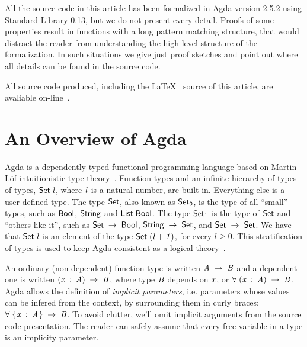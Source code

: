 \documentclass[sigconf]{acmart}
\renewcommand{\geq}{\geqslant}
\theoremstyle{definition}
\newcommand{\D}[1]{\blue{\mathsf{#1}}}
\newcommand{\V}[1]{\purple{\mathit{#1}}}
\begin{document}
All the source code in this article has been formalized in Agda
version 2.5.2 using Standard Library 0.13, but
we do not present every detail. Proofs of some properties result in
functions with a long pattern matching structure, that would distract
the reader from understanding the high-level structure of the
formalization. In such situations we give just proof sketches and point
out where all details can be found in the source code.

All source code produced, including
the \LaTeX~ source of this article, are avaliable
on-line~\cite{regex-rep}.


\section{An Overview of Agda}\label{sec:agda}

Agda is a dependently-typed functional programming language based on
Martin-L\"of intuitionistic type theory~\cite{Lof98}.  Function types
and an infinite hierarchy of types of types, \ensuremath{\D{Set}\;\V{l}}, where \ensuremath{\V{l}} is a
natural number, are built-in. Everything else is a user-defined
type. The type \ensuremath{\D{Set}}, also known as \ensuremath{\D{Set}_{\D{0}}}, is the type of all
``small'' types, such as \ensuremath{\D{Bool}}, \ensuremath{\D{String}} and \ensuremath{\D{List}\;\D{Bool}}.  The type
\ensuremath{\D{Set}_{\D{1}}} is the type of \ensuremath{\D{Set}} and ``others like it'', such as \ensuremath{\D{Set}\;\to \;\D{Bool}}, \ensuremath{\D{String}\;\to \;\D{Set}}, and \ensuremath{\D{Set}\;\to \;\D{Set}}. We have that \ensuremath{\D{Set}\;\V{l}} is an
element of the type \ensuremath{\D{Set}\;(\V{l+1})}, for every $l \geq 0$. This
stratification of types is used to keep Agda consistent as a logical
theory~\cite{Sorensen2006}.

An ordinary (non-dependent) function type is written \ensuremath{\V{A}\;\to \;\V{B}} and a
dependent one is written \ensuremath{(\V{x}\;\mathbin{:}\;\V{A})\;\to \;\V{B}}, where type \ensuremath{\V{B}} depends on
\ensuremath{\V{x}}, or \ensuremath{\D{\forall}\;(\V{x}\;\mathbin{:}\;\V{A})\;\to \;\V{B}}. Agda allows the definition of \emph{implicit
parameters}, i.e.  parameters whose values can be infered from the
context, by surrounding them in curly braces: \ensuremath{\D{\forall}\;\{\mskip1.5mu \V{x}\;\mathbin{:}\;\V{A}\mskip1.5mu\}\;\to \;\V{B}}. To
avoid clutter, we'll omit implicit arguments from the source code
presentation. The reader can safely assume that every free variable in
a type is an implicity parameter.
\end{document}

